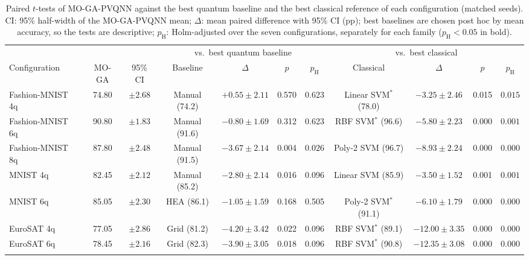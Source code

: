 \begin{table}[t]
\caption{Paired $t$-tests of MO-GA-PVQNN against the best quantum baseline and the best classical reference of each configuration (matched seeds). CI: 95\% half-width of the MO-GA-PVQNN mean; $\Delta$: mean paired difference with 95\% CI (pp); best baselines are chosen post hoc by mean accuracy, so the tests are descriptive; $p_\mathrm{H}$: Holm-adjusted over the seven configurations, separately for each family ($p_\mathrm{H}<0.05$ in bold).}\label{tab:stats}
\scriptsize\setlength\tabcolsep{3pt}
\begin{tabular}{@{}lcccccccccc@{}}
\toprule
 & & & \multicolumn{4}{c}{vs.\ best quantum baseline} & \multicolumn{4}{c}{vs.\ best classical} \\
Configuration & MO-GA & 95\% CI & Baseline & $\Delta$ & $p$ & $p_\mathrm{H}$ & Classical & $\Delta$ & $p$ & $p_\mathrm{H}$ \\
\midrule
Fashion-MNIST 4q & 74.80 & $\pm2.68$ & Manual (74.2) & $+0.55\pm2.11$ & 0.570 & 0.623 & Linear SVM$^\ast$ (78.0) & $-3.25\pm2.46$ & 0.015 & $\mathbf{0.015}$ \\
Fashion-MNIST 6q & 90.80 & $\pm1.83$ & Manual (91.6) & $-0.80\pm1.69$ & 0.312 & 0.623 & RBF SVM$^\ast$ (96.6) & $-5.80\pm2.23$ & 0.000 & $\mathbf{0.001}$ \\
Fashion-MNIST 8q & 87.80 & $\pm2.48$ & Manual (91.5) & $-3.67\pm2.14$ & 0.004 & $\mathbf{0.026}$ & Poly-2 SVM (96.7) & $-8.93\pm2.24$ & 0.000 & $\mathbf{0.000}$ \\
MNIST 4q & 82.45 & $\pm2.12$ & Manual (85.2) & $-2.80\pm2.14$ & 0.016 & 0.096 & Linear SVM (85.9) & $-3.50\pm1.52$ & 0.001 & $\mathbf{0.001}$ \\
MNIST 6q & 85.05 & $\pm2.30$ & HEA (86.1) & $-1.05\pm1.59$ & 0.168 & 0.505 & Poly-2 SVM$^\ast$ (91.1) & $-6.10\pm1.79$ & 0.000 & $\mathbf{0.000}$ \\
EuroSAT 4q & 77.05 & $\pm2.86$ & Grid (81.2) & $-4.20\pm3.42$ & 0.022 & 0.096 & RBF SVM$^\ast$ (89.1) & $-12.00\pm3.35$ & 0.000 & $\mathbf{0.000}$ \\
EuroSAT 6q & 78.45 & $\pm2.16$ & Grid (82.3) & $-3.90\pm3.05$ & 0.018 & 0.096 & RBF SVM$^\ast$ (90.8) & $-12.35\pm3.08$ & 0.000 & $\mathbf{0.000}$ \\
\botrule
\end{tabular}
\end{table}
